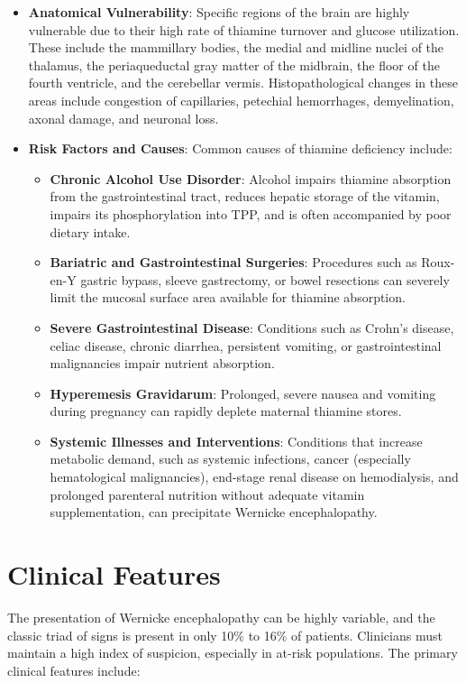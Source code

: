 \begin{itemize}
    \item \textbf{Anatomical Vulnerability}: Specific regions of the brain are highly vulnerable due to their high rate of thiamine turnover and glucose utilization. These include the mammillary bodies, the medial and midline nuclei of the thalamus, the periaqueductal gray matter of the midbrain, the floor of the fourth ventricle, and the cerebellar vermis. Histopathological changes in these areas include congestion of capillaries, petechial hemorrhages, demyelination, axonal damage, and neuronal loss.
    \item \textbf{Risk Factors and Causes}: Common causes of thiamine deficiency include:
    \begin{itemize}
        \item \textbf{Chronic Alcohol Use Disorder}: Alcohol impairs thiamine absorption from the gastrointestinal tract, reduces hepatic storage of the vitamin, impairs its phosphorylation into TPP, and is often accompanied by poor dietary intake.
        \item \textbf{Bariatric and Gastrointestinal Surgeries}: Procedures such as Roux-en-Y gastric bypass, sleeve gastrectomy, or bowel resections can severely limit the mucosal surface area available for thiamine absorption.
        \item \textbf{Severe Gastrointestinal Disease}: Conditions such as Crohn's disease, celiac disease, chronic diarrhea, persistent vomiting, or gastrointestinal malignancies impair nutrient absorption.
        \item \textbf{Hyperemesis Gravidarum}: Prolonged, severe nausea and vomiting during pregnancy can rapidly deplete maternal thiamine stores.
        \item \textbf{Systemic Illnesses and Interventions}: Conditions that increase metabolic demand, such as systemic infections, cancer (especially hematological malignancies), end-stage renal disease on hemodialysis, and prolonged parenteral nutrition without adequate vitamin supplementation, can precipitate Wernicke encephalopathy.
    \end{itemize}
\end{itemize}

\section*{Clinical Features}
The presentation of Wernicke encephalopathy can be highly variable, and the classic triad of signs is present in only 10\% to 16\% of patients. Clinicians must maintain a high index of suspicion, especially in at-risk populations. The primary clinical features include:

